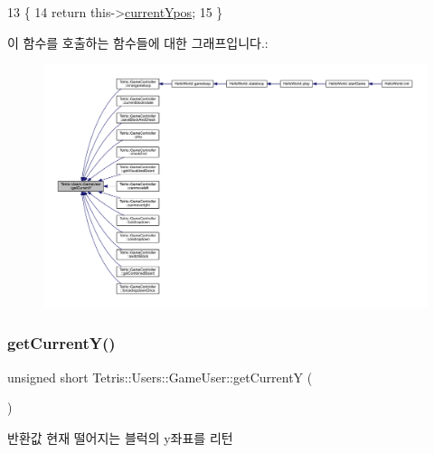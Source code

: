 \begin{DoxyCode}
13                                             \{
14                     \textcolor{keywordflow}{return} this->\hyperlink{class_tetris_1_1_users_1_1_game_user_ac1d5e4a4f73eb8502faae95d7958d83e}{currentYpos};
15                 \}
\end{DoxyCode}
이 함수를 호출하는 함수들에 대한 그래프입니다.\+:
\nopagebreak
\begin{figure}[H]
\begin{center}
\leavevmode
\includegraphics[width=350pt]{d8/d9a/class_tetris_1_1_users_1_1_game_user_af5bd7ff0b575af1b42b093488cff97e2_icgraph}
\end{center}
\end{figure}
\mbox{\label{class_tetris_1_1_users_1_1_game_user_af5bd7ff0b575af1b42b093488cff97e2}} 
\subsubsection{\texorpdfstring{get\+Current\+Y()}{getCurrentY()}\hspace{0.1cm}{\footnotesize\ttfamily [2/2]}}
{\footnotesize\ttfamily unsigned short Tetris\+::\+Users\+::\+Game\+User\+::get\+CurrentY (\begin{DoxyParamCaption}{ }\end{DoxyParamCaption})\hspace{0.3cm}{\ttfamily [inline]}}

\begin{DoxyReturn}{반환값}
현재 떨어지는 블럭의 y좌표를 리턴 
\end{DoxyReturn}


